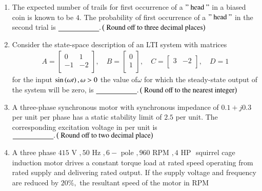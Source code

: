 \documentclass[journal]{IEEEtran}
\begin{document}
\begin{enumerate} [start=40]
\begin{figure}[H]
\end{figure}
\begin{enumerate}
    \item When switch S is ON, both $D_{1} \text{ and } D_{2} $conducts and $D_{3}$ is reverse biased
    \item When switch S is ON, $D_{1}$ conducts and both $D_{1} \text{ and } D_{2} $ are reverse biased
    \item When switch S is OFF,$D_{1}$ is reverse biased and both $D_{1} \text{ and } D_{2} $  conduct
    \item When switch S is OFF, $D_{1}$ conducts, $D_{2}$ is reverse biased and $D_{3}$ conducts
\end{enumerate}
\bigskip
\item The expected number of trails for first occurrence  of a $" \text{ head }"$ in a biased coin is known to be $4.$ The probability of first occurrence of a $" \text{ head }"$ in the second trial is $\underline{\hspace{2cm}}.\left(\text{ Round off to three decimal places}\right)$
\bigskip
\item Consider the state-space description of an LTI system with matrices
\begin{align*}
    A = \begin{bmatrix}
0 & 1 \\
-1 & -2 \\
\end{bmatrix}, \quad
B = \begin{bmatrix}
0 \\
1 \\
\end{bmatrix}, \quad
C = \begin{bmatrix}
3 & -2 \\
\end{bmatrix}, \quad
D = 1
\end{align*}
for the input $\sin\left(\omega t\right),\omega>0$ the value of$\omega$ for which the steady-state output of the system will be zero, is $\underline{\hspace{2cm}}.\left(\text{ Round off to the nearest integer}\right)$
\bigskip
\item A three-phase synchronous motor with synchronous impedance of $0.1+j0.3$ per unit per phase has a static stability limit of $2.5$ per unit. The corresponding excitation voltage in per unit is $\underline{\hspace{2cm}}.\left(\text{ Round off to two decimal place}\right)$
\bigskip
\item A three phase $415 \text{ V }, 50 \text{ Hz }, 6-\text{ pole }, 960 \text{ RPM }, 4 \text{ HP }$ squirrel cage induction motor drives a constant torque load at rated speed operating from rated supply and delivering rated output. If the supply voltage and frequency are reduced by $20\%,$ the resultant speed of the motor in RPM

\end{enumerate}
\end{document}
